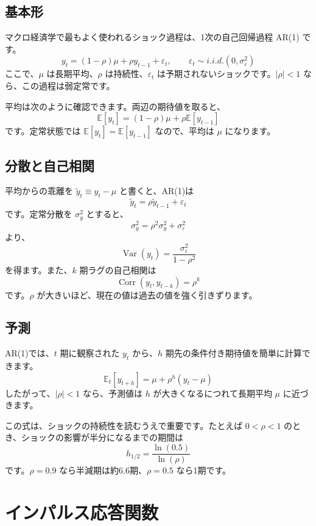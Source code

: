 \documentclass[
  japanese,
  lualatex,
  ja=standard,
  12pt,
  a4paper]{ltjsarticle}
\begin{document}
\subsection{基本形}\label{ux57faux672cux5f62}

マクロ経済学で最もよく使われるショック過程は、1次の自己回帰過程 AR(1)
です。 \[
y_t=(1-\rho)\mu+\rho y_{t-1}+\varepsilon_t,
\qquad
\varepsilon_t\sim i.i.d.(0,\sigma_\varepsilon^2)
\] ここで、\(\mu\) は長期平均、\(\rho\) は持続性、\(\varepsilon_t\)
は予期されないショックです。\(|\rho|<1\) なら、この過程は弱定常です。

平均は次のように確認できます。両辺の期待値を取ると、 \[
\mathbb{E}[y_t]
=
(1-\rho)\mu+\rho\mathbb{E}[y_{t-1}]
\] です。定常状態では \(\mathbb{E}[y_t]=\mathbb{E}[y_{t-1}]\)
なので、平均は \(\mu\) になります。

\subsection{分散と自己相関}\label{ux5206ux6563ux3068ux81eaux5df1ux76f8ux95a2}

平均からの乖離を \(\tilde{y}_t\equiv y_t-\mu\) と書くと、AR(1)は \[
\tilde{y}_t=\rho\tilde{y}_{t-1}+\varepsilon_t
\] です。定常分散を \(\sigma_y^2\) とすると、 \[
\sigma_y^2
=
\rho^2\sigma_y^2+\sigma_\varepsilon^2
\] より、 \[
\operatorname{Var}(y_t)
=
\frac{\sigma_\varepsilon^2}{1-\rho^2}
\] を得ます。また、\(k\) 期ラグの自己相関は \[
\operatorname{Corr}(y_t,y_{t-k})=\rho^k
\] です。\(\rho\) が大きいほど、現在の値は過去の値を強く引きずります。

\subsection{予測}\label{ux4e88ux6e2c}

AR(1)では、\(t\) 期に観察された \(y_t\) から、\(h\)
期先の条件付き期待値を簡単に計算できます。 \[
\mathbb{E}_t[y_{t+h}]
=
\mu+\rho^h(y_t-\mu)
\] したがって、\(|\rho|<1\) なら、予測値は \(h\)
が大きくなるにつれて長期平均 \(\mu\) に近づきます。

この式は、ショックの持続性を読むうえで重要です。たとえば \(0<\rho<1\)
のとき、ショックの影響が半分になるまでの期間は \[
h_{1/2}
=
\frac{\ln(0.5)}{\ln(\rho)}
\] です。\(\rho=0.9\) なら半減期は約6.6期、\(\rho=0.5\) なら1期です。

\section{インパルス応答関数}\label{ux30a4ux30f3ux30d1ux30ebux30b9ux5fdcux7b54ux95a2ux6570}
\end{document}

